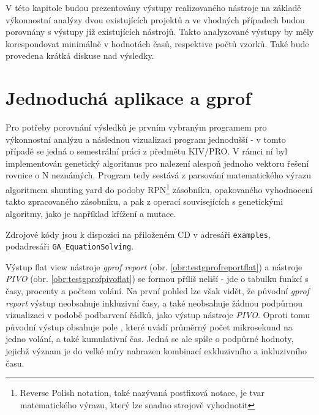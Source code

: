 \documentclass[czech,BP]{thesiskiv}
\begin{document}
V této kapitole budou prezentovány výstupy realizovaného nástroje na základě výkonnostní analýzy dvou existujících projektů a ve vhodných případech budou porovnány s výstupy již existujících nástrojů. Takto analyzované výstupy by měly korespondovat minimálně v hodnotách časů, respektive počtů vzorků. Také bude provedena krátká diskuse nad výsledky.

\section{Jednoduchá aplikace a gprof}

Pro potřeby porovnání výsledků je prvním vybraným programem pro výkonnostní analýzu a následnou vizualizaci program jednodušší - v tomto případě se jedná o semestrální práci z předmětu KIV/PRO. V rámci ní byl implementován genetický algoritmus pro nalezení alespoň jednoho vektoru řešení rovnice o N neznámých. Program tedy sestává z parsování matematického výrazu algoritmem shunting yard do podoby RPN\footnote{Reverse Polish notation, také nazývaná postfixová notace, je tvar matematického výrazu, který lze snadno strojově vyhodnotit} zásobníku, opakovaného vyhodnocení takto zpracovaného zásobníku, a pak z operací souvisejících s genetickými algoritmy, jako je například křížení a mutace.

Zdrojové kódy jsou k dispozici na přiloženém CD v adresáři \texttt{examples}, podadresáři \texttt{GA\_EquationSolving}.

Výstup flat view nástroje \emph{gprof report} (obr. \ref{obr:testgprofreportflat}) a nástroje \emph{PIVO} (obr. \ref{obr:testgprofpivoflat}) se formou příliš neliší - jde o tabulku funkcí s časy, procenty a počtem volání. Na první pohled lze však vidět, že původní \emph{gprof report} výstup neobsahuje inkluzivní časy, a také neobsahuje žádnou podpůrnou vizualizaci v podobě podbarvení řádků, jako výstup nástroje \emph{PIVO}. Oproti tomu původní výstup obsahuje pole , které uvádí průměrný počet mikrosekund na jedno volání, a také kumulativní čas. Jedná se ale spíše o podpůrné hodnoty, jejichž význam je do velké míry nahrazen kombinací exkluzivního a inkluzivního času.

\newpage
\vspace*{1cm} %
\end{document}

